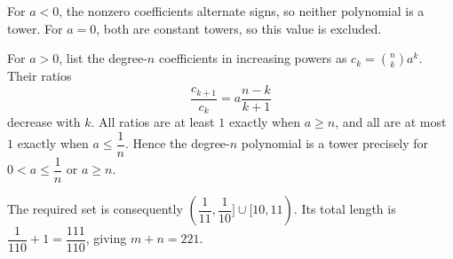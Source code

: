 For $a<0$, the nonzero coefficients alternate signs, so neither polynomial is a tower. For $a=0$, both are constant towers, so this value is excluded.

For $a>0$, list the degree-$n$ coefficients in increasing powers as $c_k=\binom nk a^k$. Their ratios
\[
\dfrac{c_{k+1}}{c_k}=a\dfrac{n-k}{k+1}
\]
decrease with $k$. All ratios are at least $1$ exactly when $a\ge n$, and all are at most $1$ exactly when $a\le\dfrac{1}{n}$. Hence the degree-$n$ polynomial is a tower precisely for $0<a\le\dfrac{1}{n}$ or $a\ge n$.

The required set is consequently $(\dfrac{1}{11},\dfrac{1}{10}]\cup[10,11)$. Its total length is $\dfrac{1}{110}+1=\dfrac{111}{110}$, giving $\boxed{m+n=221}$.
